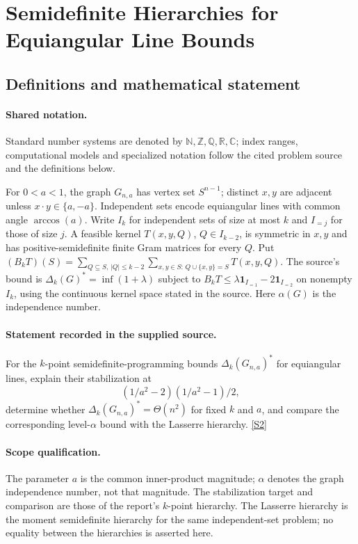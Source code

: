 \documentclass[11pt]{article}
\newcommand{\sref}[2]{\hyperlink{source:#1:#2}{[S#2]}}
\begin{document}
\section{Semidefinite Hierarchies for Equiangular Line Bounds}\label{statement}

\subsection{Definitions and mathematical statement}

\paragraph{Shared notation.}Standard number systems are denoted by $\mathbb N,\mathbb Z,\mathbb Q,\mathbb R,\mathbb C$; index ranges, computational models and specialized notation follow the cited problem source and the definitions below.


For $0<a<1$, the graph $G_{n,a}$ has vertex set $S^{n-1}$; distinct $x,y$ are adjacent unless $x\cdot y\in\{a,-a\}$. Independent sets encode equiangular lines with common angle $\arccos(a)$. Write $I_k$ for independent sets of size at most $k$ and $I_{=j}$ for those of size $j$. A feasible kernel $T(x,y,Q)$, $Q\in I_{k-2}$, is symmetric in $x,y$ and has positive-semidefinite finite Gram matrices for every $Q$. Put $(B_kT)(S)=\sum_{Q\subseteq S,\,|Q|\leq k-2}\sum_{x,y\in S:\,Q\cup\{x,y\}=S}T(x,y,Q)$. The source's bound is $\Delta_k(G)^*=\inf(1+\lambda)$ subject to $B_kT\leq\lambda\mathbf1_{I_{=1}}-2\mathbf1_{I_{=2}}$ on nonempty $I_k$, using the continuous kernel space stated in the source. Here $\alpha(G)$ is the independence number.
\paragraph{Statement recorded in the supplied source.}
For the $k$-point semidefinite-programming bounds $\Delta_k(G_{n,a})^*$ for equiangular lines, explain their stabilization at $$(1/a^2-2)(1/a^2-1)/2,$$ determine whether $\Delta_k(G_{n,a})^*=\Theta(n^2)$ for fixed $k$ and $a$, and compare the corresponding level-$\alpha$ bound with the Lasserre hierarchy. \sref{statement}{2}
\paragraph{Scope qualification.}
The parameter $a$ is the common inner-product magnitude; $\alpha$ denotes the graph independence number, not that magnitude. The stabilization target and comparison are those of the report's $k$-point hierarchy. The Lasserre hierarchy is the moment semidefinite hierarchy for the same independent-set problem; no equality between the hierarchies is asserted here.
\end{document}
